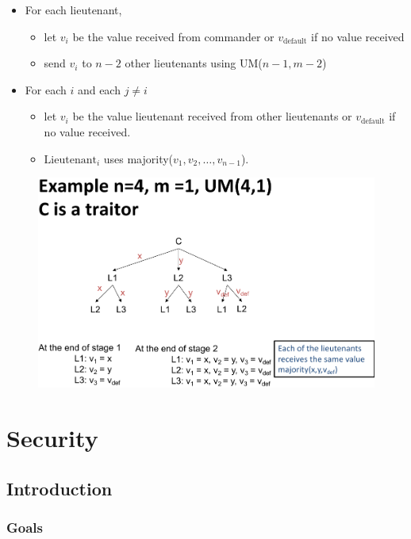 \documentclass[twocolumn,landscape,10pt]{article}
\theoremstyle{definition}
\begin{document}
\begin{itemize}
    \item For each lieutenant,
        \begin{itemize}
            \item let $v_i$ be the value received from commander or
                $v_\text{default}$ if no value received
            \item send $v_i$ to $n-2$ other lieutenants using UM($n-1,m-2$)
        \end{itemize} 
    \item For each $i$ and each $j\neq i$
        \begin{itemize}
            \item let $v_i$ be the value lieutenant received from other
                lieutenants or $v_\text{default}$ if no value received.
            \item $\text{Lieutenant}_i$ uses majority($v_1,v_2,\ldots,v_{n-1}$).
        \end{itemize} 
\end{itemize} 
\begin{figure}[h]
  	\includegraphics[scale=0.30]{C.png}
  	\centering
\end{figure}


\section{Security}

\subsection{Introduction}

\subsubsection{Goals}
\end{document}
